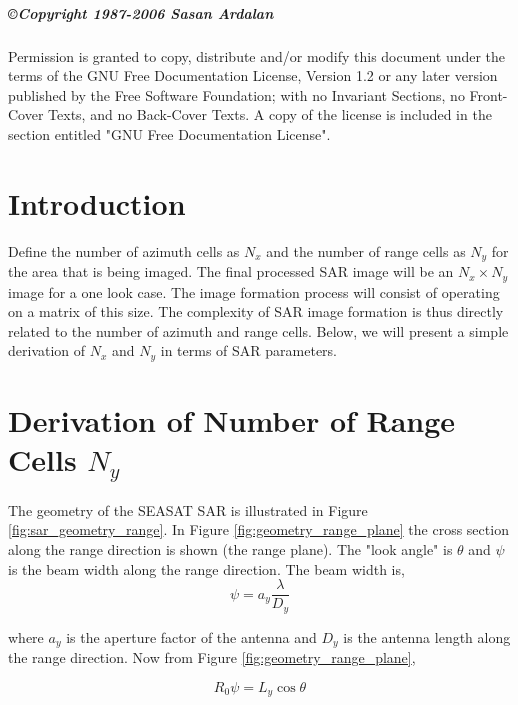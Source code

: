 \paragraph{\copyright{Copyright  1987-2006 Sasan Ardalan}}



Permission is granted to copy, distribute and/or modify this
document under the terms of the GNU Free Documentation License,
Version 1.2 or any later version published by the Free Software
Foundation; with no Invariant Sections, no Front-Cover Texts, and
no Back-Cover Texts. A copy of the license is included in the
section entitled "GNU Free Documentation License".
\pagebreak

 \setcounter{tocdepth}{1}
\tableofcontents

\listoffigures



\pagebreak
\chapter{Introduction}
Define the number of azimuth cells as $N_x$ and the number of range cells as $N_y$ for the area that is being imaged. The final processed SAR image will be an $N_x \times N_y $ image for a one look case. The image formation process will consist of operating on a matrix of this size. The complexity of SAR image formation is thus directly related to the number of azimuth and range cells. Below, we will present a simple derivation of $N_x$ and $N_y$ in terms of SAR parameters.

\chapter{Derivation of Number of Range Cells $N_y$}

The geometry of the SEASAT SAR is illustrated in Figure \ref{fig:sar_geometry_range}. In Figure \ref{fig:geometry_range_plane} the cross section along the range direction is shown (the range plane). The "look angle" is $\theta$ and $\psi$ is the beam width along the range direction. The beam width is,
\begin{equation}
\label{ }
\psi=a_y\frac{\lambda}{D_y}
\end{equation}

where $a_y$ is the aperture factor of the antenna and $D_y$ is the antenna length along the range direction. Now from Figure \ref{fig:geometry_range_plane},

\begin{equation}
\label{ }
R_0\psi = L_y \cos \theta
\end{equation}

